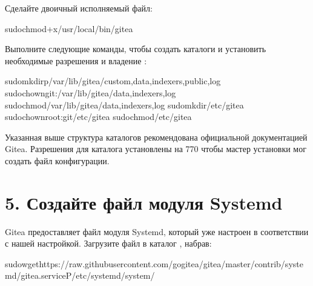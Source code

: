 \documentclass[a4paper,10pt,russian]{report}
\begin{document}
\sphinxAtStartPar
Сделайте двоичный исполняемый файл:

\begin{sphinxVerbatim}[commandchars=\\\{\}]
\PYGZdl{}sudochmod+x/usr/local/bin/gitea
\end{sphinxVerbatim}

\sphinxAtStartPar
Выполните следующие команды, чтобы создать каталоги и установить необходимые разрешения и владение :

\begin{sphinxVerbatim}[commandchars=\\\{\}]
\PYGZdl{}sudomkdir\PYGZhy{}p/var/lib/gitea/custom,data,indexers,public,log
\PYGZdl{}sudochowngit:/var/lib/gitea/data,indexers,log
\PYGZdl{}sudochmod/var/lib/gitea/data,indexers,log
\PYGZdl{}sudomkdir/etc/gitea
\PYGZdl{}sudochownroot:git/etc/gitea
\PYGZdl{}sudochmod/etc/gitea
\end{sphinxVerbatim}

\sphinxAtStartPar
Указанная выше структура каталогов рекомендована официальной документацией Gitea.
Разрешения для каталога  установлены на 770 чтобы мастер установки мог создать файл конфигурации.


\section{5. Создайте файл модуля Systemd}
\label{\detokenize{git:systemd}}
\sphinxAtStartPar
Gitea предоставляет файл модуля Systemd, который уже настроен в соответствии с нашей настройкой.
Загрузите файл в каталог  , набрав:

\begin{sphinxVerbatim}[commandchars=\\\{\}]
\PYGZdl{}sudowgethttps://raw.githubusercontent.com/go\PYGZhy{}gitea/gitea/master/contrib/systemd/gitea.service\PYGZhy{}P/etc/systemd/system/
\end{sphinxVerbatim}
\end{document}
